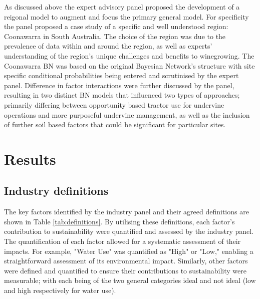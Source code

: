 As discussed above the expert advisory panel proposed the development of a reigonal model to augment and focus the primary general model. For specificity the panel proposed a case study of a specific and well understood region: Coonawarra in South Australia. The choice of the region was due to the prevalence of data within and around the region, as well as experts' understanding of the region's unique challenges and benefits to winegrowing. The Coonawarra BN was based on the original Bayesian Network's structure with site specific conditional probabilities being entered and scrutinised by the expert panel. Difference in factor interactions were further discussed by the panel, resulting in two distinct BN models that influenced two types of approaches; primarily differing between opportunity based tractor use for undervine operations and more purposeful undervine management, as well as the inclusion of further soil based factors that could be significant for particular sites.

\section{Results}

\subsection{Industry definitions}

The key factors identified by the industry panel and their agreed definitions are shown in Table \ref{tab:definitions}. By utilising these definitions, each factor's contribution to sustainability were quantified and assessed by the industry panel. The quantification of each factor allowed for a systematic assessment of their impacts. For example, "Water Use" was quantified as "High" or "Low," enabling a straightforward assessment of its environmental impact. Similarly, other factors were defined and quantified to ensure their contributions to sustainability were measurable; with each being of the two general categories ideal and not ideal (low and high respectively for water use).

% 
% 

